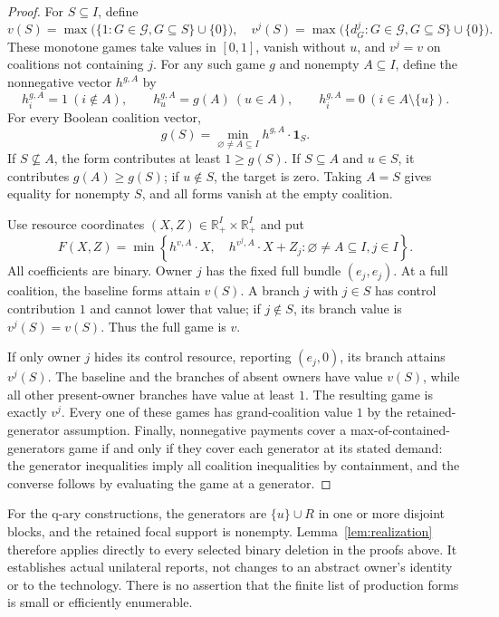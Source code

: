 \documentclass[11pt]{article}
\theoremstyle{definition}
\theoremstyle{remark}
\begin{document}
\begin{proof}
For $S\subseteq I$, define
\[
 v(S)=\max\bigl(\{1:G\in\mathcal G, G\subseteq S\}\cup\{0\}\bigr),
 \quad
 v^j(S)=\max\bigl(\{d_G^j:G\in\mathcal G, G\subseteq S\}\cup\{0\}\bigr).
\]
These monotone games take values in $[0,1]$, vanish without $u$, and
$v^j=v$ on coalitions not containing $j$.  For any such game $g$ and
nonempty $A\subseteq I$, define the nonnegative vector $h^{g,A}$ by
\[
 h_i^{g,A}=1\ (i\notin A),\qquad
 h_u^{g,A}=g(A)\ (u\in A),\qquad
 h_i^{g,A}=0\ (i\in A\setminus\{u\}).
\]
For every Boolean coalition vector,
\begin{equation}
 g(S)=\min_{\varnothing\ne A\subseteq I} h^{g,A}\cdot\mathbf1_S.
 \label{eq:game-forms}
\end{equation}
If $S\not\subseteq A$, the form contributes at least $1\ge g(S)$.
If $S\subseteq A$ and $u\in S$, it contributes $g(A)\ge g(S)$; if
$u\notin S$, the target is zero.  Taking $A=S$ gives equality for
nonempty $S$, and all forms vanish at the empty coalition.

Use resource coordinates $(X,Z)\in\mathbb R_+^I\times\mathbb R_+^I$ and
put
\begin{equation}
 F(X,Z)=\min\left\{
 h^{v,A}\cdot X,\quad h^{v^j,A}\cdot X+Z_j:
       \varnothing\ne A\subseteq I, j\in I\right\}.
 \label{eq:direct-production}
\end{equation}
All coefficients are binary.  Owner $j$ has the fixed full bundle
$(e_j,e_j)$.  At a full coalition, the baseline forms attain $v(S)$.
A branch $j$ with $j\in S$ has control contribution $1$ and cannot lower
that value; if $j\notin S$, its branch value is $v^j(S)=v(S)$.
Thus the full game is $v$.

If only owner $j$ hides its control resource, reporting $(e_j,0)$, its
branch attains $v^j(S)$.  The baseline and the branches of absent owners
have value $v(S)$, while all other present-owner branches have value at
least $1$.  The resulting game is exactly $v^j$.  Every one of these
games has grand-coalition value $1$ by the retained-generator assumption.
Finally, nonnegative payments cover a max-of-contained-generators game
if and only if they cover each generator at its stated demand: the
generator inequalities imply all coalition inequalities by containment,
and the converse follows by evaluating the game at a generator.
\end{proof}

For the q-ary constructions, the generators are $\{u\}\cup R$ in one
or more disjoint blocks, and the retained focal support is nonempty.
Lemma~\ref{lem:realization} therefore applies directly to every selected
binary deletion in the proofs above.  It establishes actual unilateral
reports, not changes to an abstract owner's identity or to the technology.
There is no assertion that the finite list of production forms is small
or efficiently enumerable.
\end{document}
